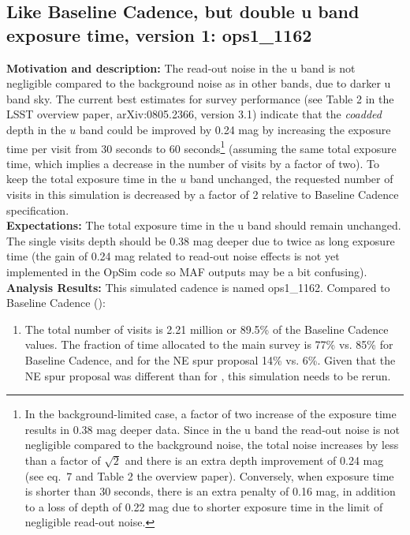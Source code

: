 \subsection{Like Baseline Cadence, but double u band exposure time, version 1: ops1\_1162 \label{sec:uband}}


{\bf Motivation and description:} The read-out noise in the u band is not negligible
compared to the background noise as in other bands, due to darker u band sky.
The current best estimates for survey performance (see Table 2 in the LSST overview paper,
arXiv:0805.2366, version 3.1) indicate that the {\it coadded} depth in the $u$ band could be
improved by 0.24 mag by increasing the exposure time per visit from 30 seconds to
60 seconds\footnote{In the background-limited case, a factor of two increase of
the exposure time results in 0.38 mag deeper data. Since in the u band the read-out noise
is not negligible compared to the background noise, the total noise increases by less than
a factor of $\sqrt{2}$ and there is an extra depth improvement of 0.24 mag (see eq.~7 and
Table 2 the overview paper). Conversely, when exposure time is shorter than 30 seconds,
there is an extra penalty of 0.16 mag, in addition to a loss of depth of 0.22 mag due to shorter
exposure time in the limit of negligible read-out noise.}
(assuming the same total exposure time, which implies a decrease in the number of
visits by a factor of two). To keep the total exposure time in the $u$ band
unchanged, the requested number of visits in this simulation is decreased by a factor of
2 relative to Baseline Cadence specification. \\

{\bf Expectations:} The total exposure time in the u band should remain unchanged.
The single visits depth should be 0.38 mag deeper due to twice as long exposure time
(the gain of 0.24 mag related to read-out noise effects is not yet implemented in the
OpSim code so MAF outputs may be a bit confusing). \\

{\bf Analysis Results:} This simulated cadence is named ops1\_1162.  Compared
to Baseline Cadence ():
\begin{enumerate}
\item The total number of visits is 2.21 million or 89.5\% of the Baseline Cadence
values. The fraction of time allocated to the main survey is 77\% vs. 85\% for Baseline
Cadence, and for the NE spur proposal 14\% vs. 6\%. Given that the NE spur proposal
was different than for , this simulation needs to be rerun.
\end{enumerate}

